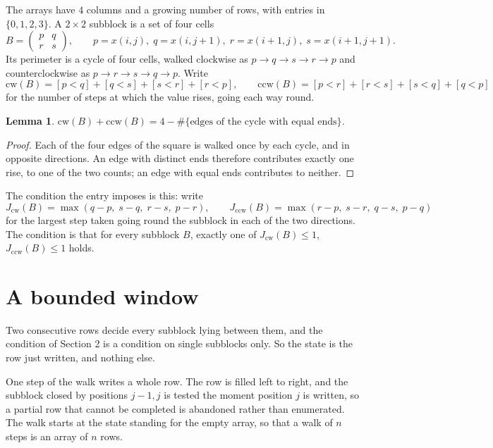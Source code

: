 \documentclass[11pt,a4paper]{article}
\theoremstyle{plain}
\newtheorem{lemma}[theorem]{Lemma}
\theoremstyle{definition}
\begin{document}
The arrays have $4$ columns and a growing number of rows, with entries in $\{0,1,2,3\}$. A
$2\times2$ subblock is a set of four cells
\[
B=\begin{pmatrix} p & q \\ r & s \end{pmatrix},
\qquad p=x(i,j),\; q=x(i,j+1),\; r=x(i+1,j),\; s=x(i+1,j+1).
\]
Its perimeter is a cycle of four cells, walked clockwise as $p\to q\to s\to r\to p$ and
counterclockwise as $p\to r\to s\to q\to p$. Write
\[
\mathrm{cw}(B)=[p<q]+[q<s]+[s<r]+[r<p],\qquad
\mathrm{ccw}(B)=[p<r]+[r<s]+[s<q]+[q<p]
\]
for the number of steps at which the value rises, going each way round.

\begin{lemma}\label{lem:sum}
$\mathrm{cw}(B)+\mathrm{ccw}(B)=4-\#\{\text{edges of the cycle with equal ends}\}$.
\end{lemma}

\begin{proof}
Each of the four edges of the square is walked once by each cycle, and in opposite directions.
An edge with distinct ends therefore contributes exactly one rise, to one of the two counts;
an edge with equal ends contributes to neither.
\end{proof}

The condition the entry imposes is this: write
\[
J_{\mathrm{cw}}(B)=\max(q-p,\;s-q,\;r-s,\;p-r),\qquad J_{\mathrm{ccw}}(B)=\max(r-p,\;s-r,\;q-s,\;p-q)
\]
for the largest step taken going round the subblock in each of the two directions. The condition is that for every subblock $B$, exactly one of $J_{\mathrm{cw}}(B)\le 1$, $J_{\mathrm{ccw}}(B)\le 1$ holds.

\section{A bounded window}

Two consecutive rows decide every subblock lying between them, and the condition of Section 2 is a condition on single subblocks only. So the state is the row just written, and nothing else.

One step of the walk writes a whole row. The row is filled left to right, and the subblock
closed by positions $j-1,j$ is tested the moment position $j$ is written, so a partial row that
cannot be completed is abandoned rather than enumerated. The walk starts at the state standing
for the empty array, so that a walk of $n$ steps is an array of $n$ rows.
\end{document}
